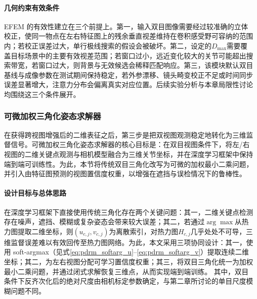 \paragraph{几何约束有效条件}
EFEM 的有效性建立在三个前提上。第一，输入双目图像需要经过较准确的立体校正，使同一物点在左右特征图上的残余垂直视差维持在卷积感受野可容纳的范围内；若校正误差过大，单行极线搜索的假设会被破坏。第二，设定的$D_{\max}$需要覆盖目标场景中的主要有效视差范围；若窗口过小，远近变化较大的关节可能超出搜索带宽，若窗口过大，则背景与无效候选会稀释匹配响应。第三，该模块默认双目基线与成像参数在测试期间保持稳定，若外参漂移、镜头畸变校正不足或时间同步误差显著增大，注意力分布会偏离真实对应位置。后续实验分析与本章局限性讨论均围绕这三个条件展开。
\subsubsection{可微加权三角化姿态求解器}
\label{subsubsec:dwt}
在获得跨视图增强后的二维表征之后，第三步是把双视图观测稳定地转化为三维监督信号。可微加权三角化姿态求解器的核心目标是：在双目视图条件下，将左/右视图的二维关键点观测与相机模型融合为三维关节坐标，并在深度学习框架中保持端到端可训练性。为此，本节将传统双目三角化改写为可微的加权最小二乘问题，并引入由特征图预测的视图置信度权重，以增强在遮挡与误检情况下的鲁棒性。

\paragraph{设计目标与总体思路}
在深度学习框架下直接使用传统三角化存在两个关键问题：其一，二维关键点检测存在噪声，遮挡、模糊或复杂姿态会带来较大误差；其二，若通过$\arg\max$从热力图提取二维坐标，则$(u_{c,j},v_{c,j})$为离散索引，对热力图$H_{c,j}$几乎处处不可导，三维监督误差难以有效回传至热力图网络。为此，本文采用三项协同设计：其一，使用 soft-argmax（见式\eqref{eq:pdrm_softarg_u}--\eqref{eq:pdrm_softarg_v}）提取连续二维坐标；其二，为左右视图分配可学习置信度权重；其三，将双目三角化统一为加权最小二乘问题，并通过闭式求解恢复三维点，从而实现端到端训练。
其中，双目条件下反齐次化后的绝对尺度由相机标定参数确定，与第二章所讨论的单目尺度模糊问题不同。

